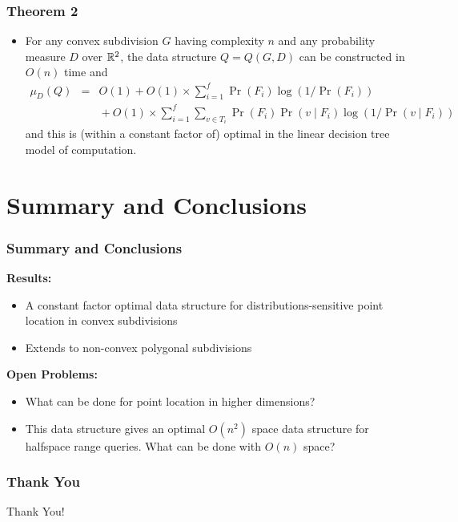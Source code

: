 \documentclass{beamer}
\begin{document}
\frame
{
	\frametitle{Theorem 2}

	\begin{itemize}
	\item For any convex subdivision $G$ having complexity $n$ and
	any probability measure $D$ over $\mathbb{R}^2$, the data structure
$Q=Q(G,D)$ can be constructed in $O(n)$ time and 
	\begin{eqnarray*}
	\mu_D(Q) 
         & = & O(1)+O(1)\times\sum_{i=1}^f\Pr(F_i)\log
(1/\Pr(F_i)) \\ & & {}+ O(1)\times\sum_{i=1}^f\sum_{v\in T_i}\Pr(F_i)\Pr(v\mid
F_i)\log(1/\Pr(v\mid F_i))
	\end{eqnarray*}
	and this is (within a constant factor of) optimal in the linear decision tree model of
computation.
	\end{itemize}
}

\section{Summary and Conclusions}
\frame
{
	\frametitle{Summary and Conclusions}
	\textbf{Results:}
	\begin{itemize}
	\item<2-> A constant factor optimal data structure for
distributions-sensitive point location in convex subdivisions
	\item<3-> Extends to non-convex polygonal subdivisions
	\end{itemize}
	\textbf{Open Problems:}
	\begin{itemize}
	\item<4-> What can be done for point location in higher dimensions?
	\item<5-> This data structure gives an optimal $O(n^2)$ space data structure for halfspace range queries.  What can be done with $O(n)$ space?
	\end{itemize}
}

\frame
{
	\frametitle{Thank You}
	\Huge Thank You!
}
\end{document}
